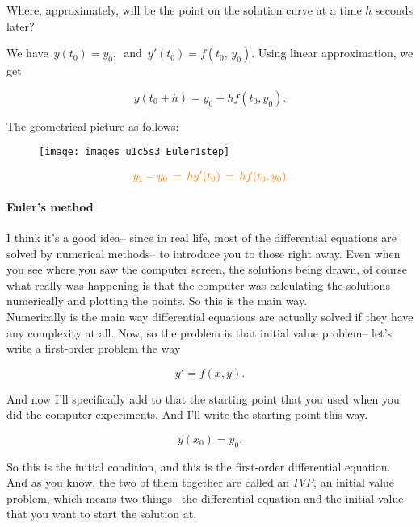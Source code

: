 \begin{question}
  Where, approximately,
  will be the point on the solution curve at a time $h$ seconds later?
\end{question}

We have $\,y(t_0) = y_0,\,$ and $\,y'(t_0) = f(t_0,\,y_0)$.
Using linear approximation, we get

\begin{equation*}
  y(t_0+h)=y_0+hf(t_0, y_0).
\end{equation*}

The geometrical picture as follows:

\begin{figure}[ht!]
  \centering
  \texttt{[image: images\_u1c5s3\_Euler1step]}
\end{figure}

\begin{equation*}
  {\color{orange}{ y_1-y_0\, = \, h y'(t_0)\, =\, hf(t_0,y_0)}}
\end{equation*}

\paragraph{Euler's method}
I think it's a good idea-- since in real life,
most of the differential equations are solved by numerical methods--
to introduce you to those right away.
Even when you see where you saw the computer screen,
the solutions being drawn, of course what really was happening is that the computer
was calculating the solutions numerically and plotting the points.
So this is the main way. \\
Numerically is the main way differential equations
are actually solved if they have any complexity at all.
Now, so the problem is that initial value problem--
let's write a first-order problem the way

\begin{equation*}
  y' = f(x, y). 
\end{equation*}

And now I'll specifically add to that the starting point
that you used when you did the computer experiments.
And I'll write the starting point this way.

\begin{equation*}
  y(x_0) = y_0. 
\end{equation*}

So this is the initial condition,
and this is the first-order differential equation.
And as you know, the two of them together are called an \emph{IVP},
an initial value problem, which means two things--
the differential equation and the initial value that you want to start the solution at. \\

